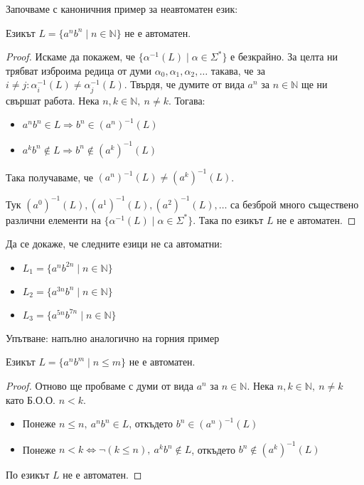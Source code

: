 \pagebreak

Започваме с каноничния пример за неавтоматен език:

\begin{claim}
    Езикът $L = \{ a^nb^n \mid n \in \mathbb{N} \}$ не е автоматен.
\end{claim}

\begin{proof}
    Искаме да покажем, че $\{ \alpha^{-1}(L) \mid \alpha \in \Sigma^* \}$ е безкрайно.
    За целта ни трябват изброима редица от думи $\alpha_0, \alpha_1, \alpha_2, \dots$ такава, че за $i \neq j : \alpha_i^{-1}(L) \neq \alpha_j^{-1}(L)$.
    Твърдя, че думите от вида $a^n$ за $n \in \mathbb{N}$ ще ни свършат работа.
    Нека $n, k \in \mathbb{N}, \: n \neq k$.
    Тогава:
    \begin{itemize}
        \item $a^nb^n \in L \Rightarrow b^n \in (a^n)^{-1}(L)$
        \item $a^kb^n \notin L \Rightarrow b^n \notin (a^k)^{-1}(L)$
    \end{itemize}
    Така получаваме, че $(a^n)^{-1}(L) \neq (a^k)^{-1}(L)$.

    Тук $(a^0)^{-1}(L), (a^1)^{-1}(L), (a^2)^{-1}(L), \dots$ са безброй много съществено различни елементи на $\{ \alpha^{-1}(L) \mid \alpha \in \Sigma^* \}$.
    Така по  езикът $L$ не е автоматен.
\end{proof}

\begin{problem}
Да се докаже, че следните езици не са автоматни:
\begin{itemize}
    \item $L_1 = \{ a^nb^{2n} \mid n \in \mathbb{N} \}$
    \item $L_2 = \{ a^{3n}b^n \mid n \in \mathbb{N} \}$
    \item $L_3 = \{ a^{5n}b^{7n} \mid n \in \mathbb{N} \}$
\end{itemize}
Упътване: напълно аналогично на горния пример
\end{problem}

\begin{claim}
    Езикът $L = \{ a^nb^m \mid n \leq m \}$ не е автоматен.
\end{claim}

\begin{proof}
    Отново ще пробваме с думи от вида $a^n$ за $n \in \mathbb{N}$.
    Нека $n, k \in \mathbb{N}, \: n \neq k$ като Б.О.О. $n < k$.
    \begin{itemize}
        \item Понеже $n \leq n, \: a^nb^n \in L$, откъдето $b^n \in (a^n)^{-1}(L)$
        \item Понеже $n < k \iff \neg(k \leq n), \: a^kb^n \notin L$, откъдето $b^n \notin (a^k)^{-1}(L)$
    \end{itemize}
    По  езикът $L$ не е автоматен.
\end{proof}

